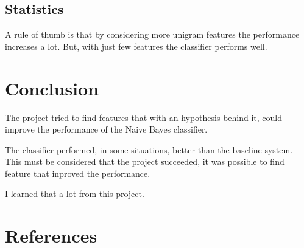 \documentclass[a4paper, 12pt]{article}
\begin{document}
\subsection{Statistics}
A rule of thumb is that by considering more unigram features the performance increases a lot.
But, with just few features the classifier performs well.
\section{Conclusion}
The project tried to find features that with an hypothesis behind it, could improve the performance of the Naive Bayes classifier.

The classifier performed, in some situations, better than the baseline system.
This must be considered that the project succeeded, it was possible to find feature that inproved the performance.

I learned that a lot from this project.

\section*{References}



\end{document}
